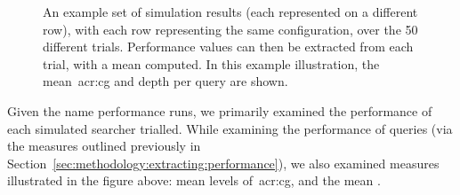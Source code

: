 
\begin{figure}[t!]
    \centering
    \caption[Illustration of how average measures are computed]{An example set of simulation results (each represented on a different row), with each row representing the same configuration, over the 50 different trials. Performance values can then be extracted from each trial, with a mean computed. In this example illustration, the mean~\gls{acr:cg} and depth per query are shown.}
    \label{fig:example_sim_configuration}
\end{figure}

Given the name performance runs, we primarily examined the performance of each simulated searcher trialled. While examining the performance of queries (via the measures outlined previously in Section~\ref{sec:methodology:extracting:performance}), we also examined measures illustrated in the figure above: mean levels of~\gls{acr:cg}, and the mean .


